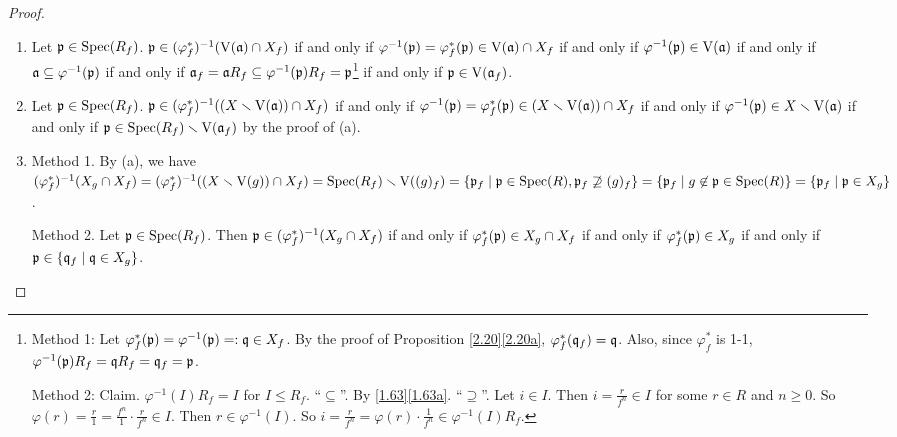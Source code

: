 \begin{proof}
    \begin{enumerate}
        \item Let $\mathfrak{p} \in \operatorname{Spec}(R_f)$. $\mathfrak{p} \in (\varphi_f^*)^{-1}(\operatorname{V}(\mathfrak{a}) \cap X_f)$ if and only if $\varphi^{-1}(\mathfrak{p}) = \varphi_f^*(\mathfrak{p}) \in \operatorname{V}(\mathfrak{a}) \cap X_f$ if and only if $\varphi^{-1}(\mathfrak{p}) \in \operatorname{V}(\mathfrak{a})$ if and only if $\mathfrak{a} \subseteq \varphi^{-1}(\mathfrak{p})$ if and only if $\mathfrak{a}_f = \mathfrak{a} R_f \subseteq \varphi^{-1}(\mathfrak{p})R_f = \mathfrak{p}$\footnote[2]{Method 1: Let $\varphi_f^*(\mathfrak{p}) = \varphi^{-1}(\mathfrak{p}) =: \mathfrak{q} \in X_f$. By the proof of Proposition \ref{2.20}\ref{2.20a}, $\varphi_f^*(\mathfrak{q}_f) = \mathfrak{q}$. Also, since $\varphi_f^*$ is 1-1, $\varphi^{-1}(\mathfrak{p}) R_f = \mathfrak{q} R_f = \mathfrak{q}_f = \mathfrak{p}$. \par Method 2: Claim. $\varphi^{-1}(I)R_f = I$ for $I \leq R_f$. ``$\subseteq$''. By \ref{1.63}\ref{1.63a}. ``$\supseteq$''. Let $i \in I$. Then $i = \frac{r}{f^n} \in I$ for some $r \in R$ and $n \geq 0$. So $\varphi(r) = \frac{r}{1} = \frac{f^n}{1} \cdot \frac{r}{f^n} \in I$. Then $r \in \varphi^{-1}(I)$. So $i = \frac{r}{f^n} = \varphi(r) \cdot \frac{1}{f^n} \in \varphi^{-1}(I) R_f$.} if and only if $\mathfrak{p} \in \operatorname{V}(\mathfrak{a}_f)$.
        \item Let $\mathfrak{p} \in \operatorname{Spec}(R_f)$. $\mathfrak{p} \in (\varphi_f^*)^{-1}((X \smallsetminus \operatorname{V}(\mathfrak{a})) \cap X_f)$ if and only if $\varphi^{-1}(\mathfrak{p}) = \varphi_f^*(\mathfrak{p}) \in (X \smallsetminus \operatorname{V}(\mathfrak{a})) \cap X_f$ if and only if $\varphi^{-1}(\mathfrak{p}) \in X \smallsetminus \operatorname{V}(\mathfrak{a})$ if and only if $\mathfrak{p} \in \operatorname{Spec}(R_f) \smallsetminus \operatorname{V}(\mathfrak{a}_f)$ by the proof of (a).
        \item Method 1. By (a), we have $(\varphi^*_f)^{-1}(X_g \cap X_f) = (\varphi^*_f)^{-1}((X \smallsetminus \operatorname{V}(g)) \cap X_f) = \operatorname{Spec}(R_f) \smallsetminus \operatorname{V}((g)_f) = \{\mathfrak{p}_f \mid \mathfrak{p} \in \operatorname{Spec}(R), \mathfrak{p}_f \not \supseteq (g)_f\} = \{\mathfrak{p}_f \mid g \not \in \mathfrak{p} \in \operatorname{Spec}(R)\} = \{\mathfrak{p}_f \mid \mathfrak{p} \in X_g\}$. \par 
            Method 2. Let $\mathfrak{p} \in \operatorname{Spec}(R_f)$. Then $\mathfrak{p} \in (\varphi_f^*)^{-1}(X_g \cap X_f)$ if and only if $\varphi_f^*(\mathfrak{p}) \in X_g \cap X_f$ if and only if $\varphi_f^*(\mathfrak{p}) \in X_g$ if and only if $\mathfrak{p} \in \{\mathfrak{q}_f \mid \mathfrak{q} \in X_g\}$. \qedhere
    \end{enumerate}
\end{proof}

